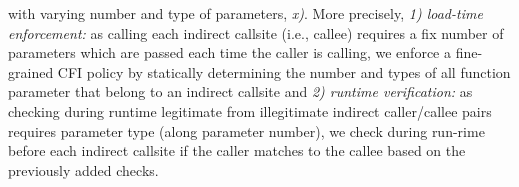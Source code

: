 with varying number and type of parameters, \textit{x)}.
More precisely, 
\textit{1) load-time enforcement:} as calling each indirect callsite (i.e., callee) requires 
a fix number of parameters which are passed each time the caller is calling, we
enforce a fine-grained CFI policy by statically determining the number and types of all function parameter
that belong to an indirect callsite and
\textit{2) runtime verification:} as checking during runtime legitimate from
illegitimate indirect caller/callee pairs requires parameter type (along parameter number),
we check during run-rime before each indirect callsite if the caller matches to the callee 
based on the previously added checks.

% 
% 


